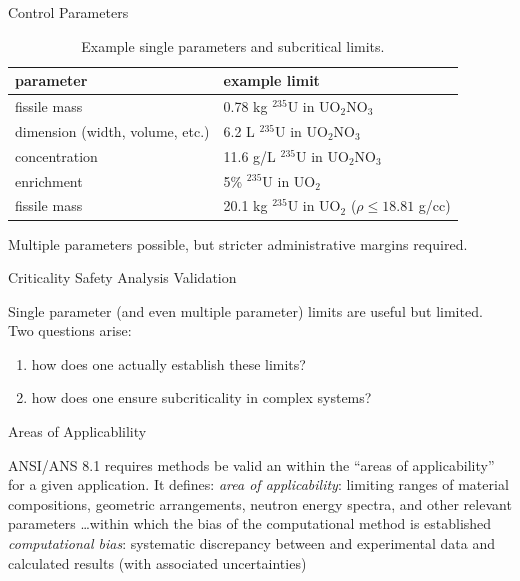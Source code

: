 \documentclass[10pt]{beamer}
\begin{document}
\begin{frame}[fragile]{Control Parameters}
\begin{table}[ht]
    \caption{Example single parameters and subcritical limits.}
    \begin{center} 
    \begin{tabular*}{0.99\textwidth}{@{\extracolsep{\fill}} ll } 
      \toprule 
        parameter &  example limit \\
      \midrule
       fissile mass                    &  0.78 kg  ${}^{235}$U in UO$_2$NO$_3$ \\
       dimension (width, volume, etc.) &  6.2   L  ${}^{235}$U in UO$_2$NO$_3$ \\
       concentration                   &  11.6 g/L ${}^{235}$U in UO$_2$NO$_3$ \\
       enrichment                      &  5\%      ${}^{235}$U in UO$_2$       \\
       fissile mass                    &  20.1 kg  ${}^{235}$U in UO$_2$ 
                                          ($\rho \leq 18.81$ g/cc) \\
      \bottomrule 
    \end{tabular*} 
    \end{center} 
    \label{tbl:controlparams}
\end{table}
\vfill
Multiple parameters possible, but stricter administrative margins required.

\end{frame}


\begin{frame}{Criticality Safety Analysis Validation}

Single parameter (and even multiple parameter) limits are useful but
limited.  
\vfill
Two questions arise:
\begin{enumerate}
 \item how does one actually establish these limits?
 \item how does one ensure subcriticality in complex systems?
\end{enumerate}

\end{frame}

\begin{frame}{Areas of Applicablility}

ANSI/ANS 8.1 requires methods be valid an within the ``areas of 
applicability'' for a given application.  It defines:
\vfill
{\it area of applicability}:  limiting 
ranges of material compositions, geometric arrangements, neutron energy 
spectra, and other relevant parameters \ldots within which the bias of the 
computational method is established
\vfill
{\it computational bias}:  systematic 
discrepancy between and experimental data and calculated results (with
associated uncertainties)

\end{frame}
\end{document}
